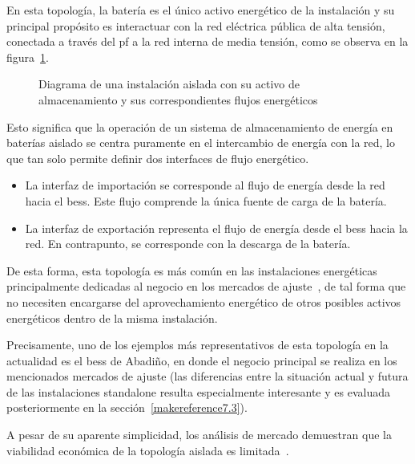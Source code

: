 En esta topología, la batería es el único activo energético de la instalación y su principal propósito es interactuar con la red eléctrica pública de alta tensión, conectada a través del \gls{pf} a la red interna de media tensión, como se observa en la figura~\ref{fig:topologia-aislada}.

\begin{figure}
  \centering
  \caption{Diagrama de una instalación aislada con su activo de almacenamiento y sus correspondientes flujos energéticos}
  \label{fig:topologia-aislada}
\end{figure}

Esto significa que la operación de un sistema de almacenamiento de energía en baterías aislado se centra puramente en el intercambio de energía con la red, lo que tan solo permite definir dos interfaces de flujo energético.

\begin{itemize}

  \item La interfaz de importación se corresponde al flujo de energía desde la red hacia el \gls{bess}. Este flujo comprende la única fuente de carga de la batería.

  \item  La interfaz de exportación representa el flujo de energía desde el \gls{bess} hacia la red. En contrapunto, se corresponde con la descarga de la batería.

\end{itemize}

De esta forma, esta topología es más común en las instalaciones energéticas principalmente dedicadas al negocio en los mercados de ajuste~\cite{carbajo2007mercados}, de tal forma que no necesiten encargarse del aprovechamiento energético de otros posibles activos energéticos dentro de la misma instalación.

Precisamente, uno de los ejemplos más representativos de esta topología en la actualidad es el \gls{bess} de Abadiño, en donde el negocio principal se realiza en los mencionados mercados de ajuste (las diferencias entre la situación actual y futura de las instalaciones standalone resulta especialmente interesante y es evaluada posteriormente en la sección~\ref{makereference7.3}).

A pesar de su aparente simplicidad, los análisis de mercado demuestran que la viabilidad económica de la topología aislada es limitada~\cite{azahra2020optimized, baviskar2023opportunities, kalenderova2024batery}.

